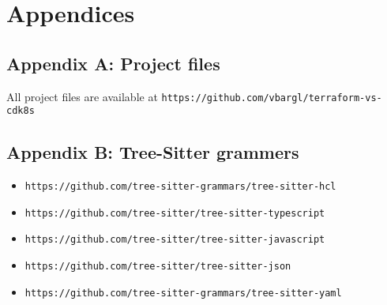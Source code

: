 \documentclass{article}
\begin{document}


\printbibliography
\pagebreak

\section{Appendices}
\subsection{Appendix A: Project files}
All project files are available at \texttt{https://github.com/vbargl/terraform-vs-cdk8s}

\subsection{Appendix B: Tree-Sitter grammers}
\begin{itemize}
\item \texttt{https://github.com/tree-sitter-grammars/tree-sitter-hcl}
\item \texttt{https://github.com/tree-sitter/tree-sitter-typescript}
\item \texttt{https://github.com/tree-sitter/tree-sitter-javascript}
\item \texttt{https://github.com/tree-sitter/tree-sitter-json}
\item \texttt{https://github.com/tree-sitter-grammars/tree-sitter-yaml}
\end{itemize}
\pagebreak
\end{document}
